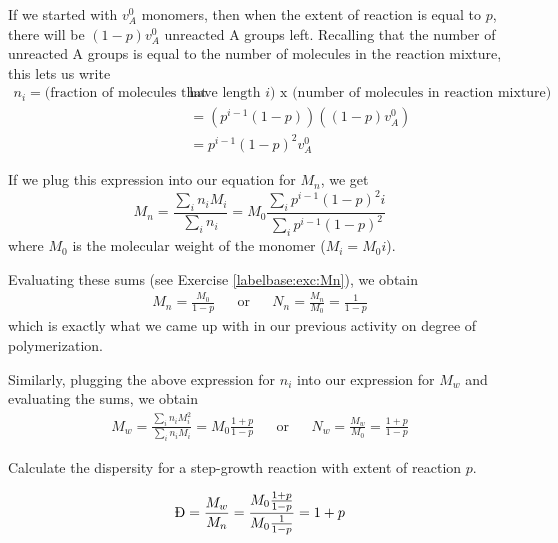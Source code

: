 \begin{activity}
\begin{model}
	If we started with $v_A^0$ monomers, then when the extent of reaction is equal to $p$, there will be $(1-p)v_A^0$ unreacted A groups left.  Recalling that the number of unreacted A groups is equal to the number of molecules in the reaction mixture, this lets us write
	\begin{align*}
		n_i = \text{(fraction of molecules that }&\text{have length }i\text{) x (number of molecules in reaction mixture)}\\
			&= \left(p^{i-1}(1-p)\right)\left((1-p)v_A^0\right)\\
			&= p^{i-1}(1-p)^2v_A^0
	\end{align*}
	
	If we plug this expression into our equation for $M_n$, we get
	\begin{equation*}
		M_n = \frac{\sum_i n_i M_i}{\sum_i n_i} %
		= M_0\frac{\sum_i p^{i-1}(1-p)^2 i }{\sum_i p^{i-1}(1-p)^2}
	\end{equation*}
	where $M_0$ is the molecular weight of the monomer ($M_i = M_0 i$).
	
	\vspace{0.25in}
	
	Evaluating these sums (see Exercise \ref{labelbase:exc:Mn}), we obtain
	\begin{align*}
		M_n = \frac{M_0}{1-p} && \text{or} && N_n = \frac{M_n}{M_0} = \frac{1}{1-p}
	\end{align*}
	which is exactly what we came up with in our previous activity on degree of polymerization.
	
	\vspace{0.25in}
	Similarly, plugging the above expression for $n_i$ into our expression for $M_w$ and evaluating the sums, we obtain
	\begin{align*}
		M_w = \frac{\sum_i n_i M_i^2}{\sum_i n_i M_i} = M_0\frac{1+p}{1-p} && \text{or} && N_w = \frac{M_w}{M_0} = \frac{1+p}{1-p}
	\end{align*}

\end{model}

\begin{ctqs}
		\question Calculate the dispersity for a step-growth reaction with extent of reaction $p$.
		
			\begin{solution}[1.95in]
			
				\begin{equation*}
					\text{\DJ} = \frac{M_w}{M_n} = \frac{M_0\frac{1+p}{1-p}}{M_0\frac{1}{1-p}} = 1+p
				\end{equation*}
			\end{solution}
			

\end{ctqs}
\end{activity}
